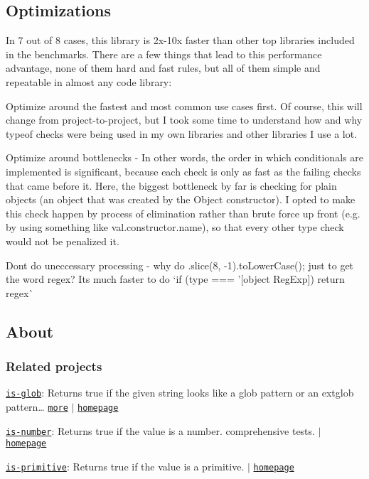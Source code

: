 \subsection*{Optimizations}

In 7 out of 8 cases, this library is 2x-\/10x faster than other top libraries included in the benchmarks. There are a few things that lead to this performance advantage, none of them hard and fast rules, but all of them simple and repeatable in almost any code library\+:


\begin{DoxyEnumerate}
\item Optimize around the fastest and most common use cases first. Of course, this will change from project-\/to-\/project, but I took some time to understand how and why {\ttfamily typeof} checks were being used in my own libraries and other libraries I use a lot.
\item Optimize around bottlenecks -\/ In other words, the order in which conditionals are implemented is significant, because each check is only as fast as the failing checks that came before it. Here, the biggest bottleneck by far is checking for plain objects (an object that was created by the {\ttfamily Object} constructor). I opted to make this check happen by process of elimination rather than brute force up front (e.\+g. by using something like {\ttfamily val.\+constructor.\+name}), so that every other type check would not be penalized it.
\item Don\textquotesingle{}t do uneccessary processing -\/ why do {\ttfamily .slice(8, -\/1).to\+Lower\+Case();} just to get the word {\ttfamily regex}? It\textquotesingle{}s much faster to do `if (type === '\mbox{[}object Reg\+Exp\mbox{]}\textquotesingle{}) return \textquotesingle{}regex\textquotesingle{}\`{}
\end{DoxyEnumerate}

\subsection*{About}

\subsubsection*{Related projects}


\begin{DoxyItemize}
\item \href{https://www.npmjs.com/package/is-glob}{\tt is-\/glob}\+: Returns {\ttfamily true} if the given string looks like a glob pattern or an extglob pattern… \href{https://github.com/jonschlinkert/is-glob}{\tt more} $\vert$ \href{https://github.com/jonschlinkert/is-glob}{\tt homepage}
\item \href{https://www.npmjs.com/package/is-number}{\tt is-\/number}\+: Returns true if the value is a number. comprehensive tests. $\vert$ \href{https://github.com/jonschlinkert/is-number}{\tt homepage}
\item \href{https://www.npmjs.com/package/is-primitive}{\tt is-\/primitive}\+: Returns {\ttfamily true} if the value is a primitive. $\vert$ \href{https://github.com/jonschlinkert/is-primitive}{\tt homepage}
\end{DoxyItemize}

